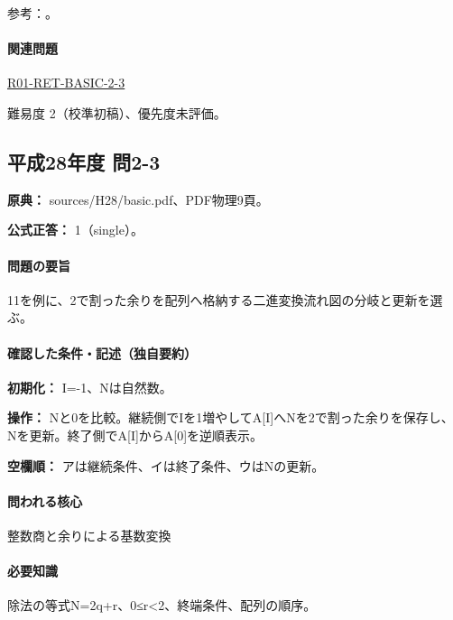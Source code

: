 \par 参考：\cite{nist_binary_prefix}。

\paragraph{関連問題} \hyperref[q:r01-ret-basic-2-3]{R01-RET-BASIC-2-3}

\par 難易度 2（校準初稿）、優先度未評価。

\subsection{平成28年度 問2-3}
\label{q:h28-reg-basic-2-3}

\noindent\textbf{原典：} sources/H28/basic.pdf、PDF物理9頁。

\textbf{公式正答：} 1（single）。

\paragraph{問題の要旨} 11を例に、2で割った余りを配列へ格納する二進変換流れ図の分岐と更新を選ぶ。

\paragraph{確認した条件・記述（独自要約）}\mbox{}\par

\noindent\textbf{初期化：} I=-1、Nは自然数。\par

\noindent\textbf{操作：} Nと0を比較。継続側でIを1増やしてA[I]へNを2で割った余りを保存し、Nを更新。終了側でA[I]からA[0]を逆順表示。\par

\noindent\textbf{空欄順：} アは継続条件、イは終了条件、ウはNの更新。\par

\paragraph{問われる核心} 整数商と余りによる基数変換

\paragraph{必要知識} 除法の等式N=\allowbreak{}2q+r、0≤r<2、終端条件、配列の順序。


